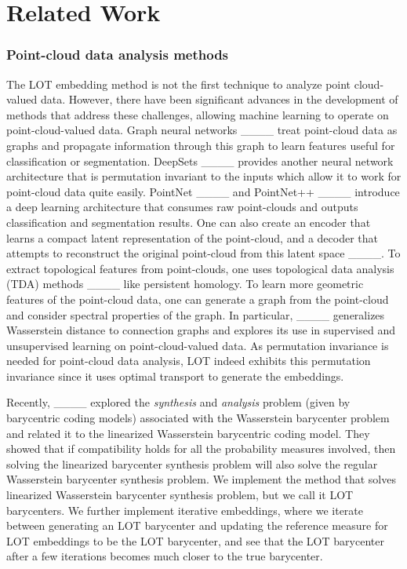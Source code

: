 \section{Related Work}
\subsubsection{Point-cloud data analysis methods}

The LOT embedding method is not the first technique to analyze point cloud-valued data. However, there have been significant advances in the development of methods that address these challenges, allowing machine learning to operate on point-cloud-valued data. Graph neural networks ____ treat point-cloud data as graphs and propagate information through this graph to learn features useful for classification or segmentation. 
DeepSets ____ provides another neural network architecture that is permutation invariant to the inputs which allow it to work for point-cloud data quite easily.  PointNet ____ and PointNet++ ____ introduce a deep learning architecture that consumes raw point-clouds and outputs classification and segmentation results. One can also create an encoder that learns a compact latent representation of the point-cloud, and a decoder that attempts to reconstruct the original point-cloud from this latent space ____. To extract topological features from point-clouds, one uses topological data analysis (TDA) methods ____ like persistent homology. To learn more geometric features of the point-cloud data, one can generate a graph from the point-cloud and consider spectral properties of the graph. In particular, ____ generalizes Wasserstein distance to connection graphs and explores its use in supervised and unsupervised learning on point-cloud-valued data. As permutation invariance is needed for point-cloud data analysis, LOT indeed exhibits this permutation invariance since it uses optimal transport to generate the embeddings.

Recently, ____ explored the \textit{synthesis} and \textit{analysis} problem (given by barycentric coding models) associated with the Wasserstein barycenter problem and related it to the linearized Wasserstein barycentric coding model. They showed that if compatibility holds for all the probability measures involved, then solving the linearized barycenter synthesis problem will also solve the regular Wasserstein barycenter synthesis problem.  We implement the method that solves linearized Wasserstein barycenter synthesis problem, but we call it LOT barycenters.  We further implement iterative embeddings, where we iterate between generating an LOT barycenter and updating the reference measure for LOT embeddings to be the LOT barycenter, and see that the LOT barycenter after a few iterations becomes much closer to the true barycenter.

